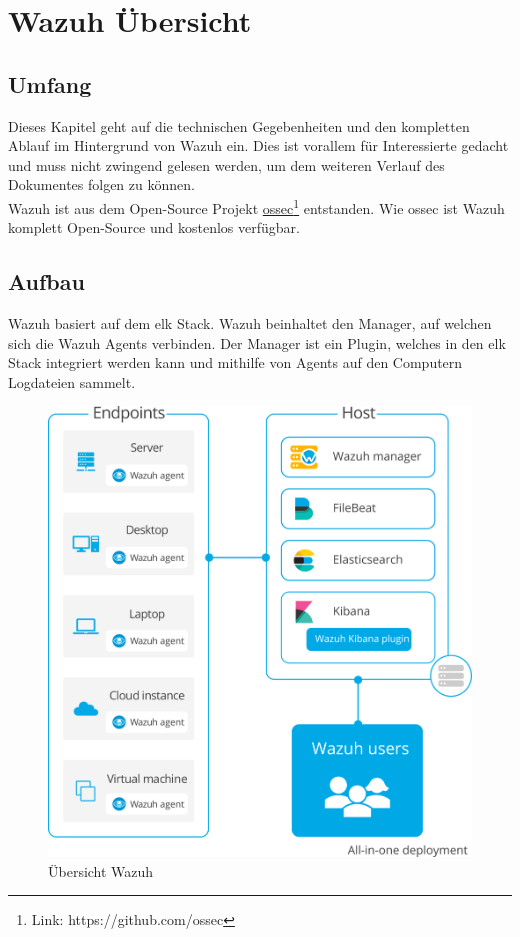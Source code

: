 \chapter{Wazuh Übersicht}
\section{Umfang}
Dieses Kapitel geht auf die technischen Gegebenheiten und den kompletten Ablauf im Hintergrund von Wazuh ein.
Dies ist vorallem für Interessierte gedacht und muss nicht zwingend gelesen werden, um dem weiteren Verlauf des Dokumentes folgen zu können.\\

Wazuh ist aus dem Open-Source Projekt \href{https://github.com/ossec}{ossec}\footnote{Link: https://github.com/ossec} entstanden. Wie ossec ist Wazuh komplett Open-Source und kostenlos verfügbar.

\section{Aufbau}

\begin{minipage}{0.4\linewidth}
Wazuh basiert auf dem \acrfull{elk} Stack.
Wazuh beinhaltet den Manager, auf welchen sich die Wazuh Agents verbinden. 
Der Manager ist ein Plugin, welches in den \acrshort{elk} Stack integriert werden kann und mithilfe von Agents auf den Computern Logdateien sammelt.

\end{minipage}
\begin{minipage}{0.6\linewidth}
    \begin{figure}[H]
        \centering
        \includegraphics[width=0.8\linewidth]{../img/aufbau-wazuh.png}
        \caption[Übersicht Wazuh]{Übersicht Wazuh\footnotemark}
    \end{figure}
    
\end{minipage}



